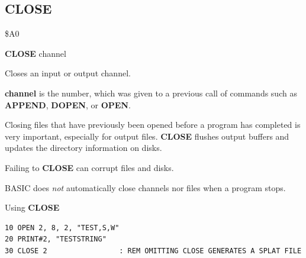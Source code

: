 \subsection{CLOSE}
\begin{description}[leftmargin=2cm,style=nextline]
\item [Token:]   \$A0

\item [Format:]  {\bf CLOSE} channel

\item [Usage:]   Closes an input or output channel.

                 {\bf channel} is the number, which was given to a previous call of commands such as {\bf APPEND}, {\bf DOPEN}, or {\bf OPEN}.

\item [Remarks:] Closing files that have previously been opened before a program has completed is very important, especially for output files.
                 {\bf CLOSE} flushes output buffers and updates the directory information on disks.

                 Failing to {\bf CLOSE} can corrupt files and disks.

                 BASIC does {\em not} automatically close channels nor files when a program stops.

\item [Example:] Using {\bf CLOSE}

\begin{tcolorbox}[colback=black,coltext=white]
\verbatimfont{\codefont}
\begin{verbatim}
10 OPEN 2, 8, 2, "TEST,S,W"
20 PRINT#2, "TESTSTRING"
30 CLOSE 2                 : REM OMITTING CLOSE GENERATES A SPLAT FILE
\end{verbatim}
\end{tcolorbox}
\end{description}


\newpage
